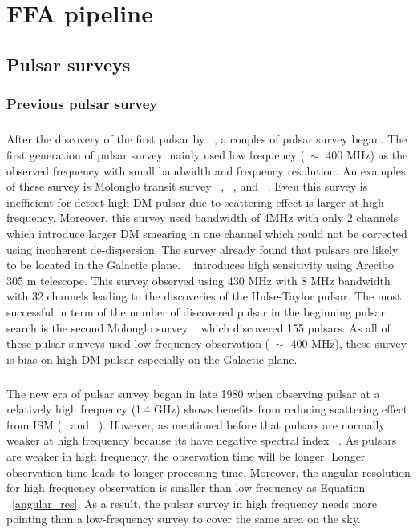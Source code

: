 \documentclass[thesis_msc.tex]{subfiles}
\begin{document}
\chapter{FFA pipeline} \label{FFA_c}
 	\section{Pulsar surveys}
        \subsection{Previous pulsar survey } \label{survey}
        \paragraph{} After the discovery of the first pulsar by ~\citep{HEWISH1968}, a couples of pulsar survey began. The first generation of pulsar survey mainly used low frequency ($~\sim$ 400 MHz) as the observed frequency with small bandwidth and frequency resolution. An examples of these survey is Molonglo transit survey ~\citep{Large:1968:mi}, ~\citep{Vaughan:1970:lm}, and ~\citep{Davies:1970:lm}. Even this survey is inefficient for detect high DM pulsar due to scattering effect is larger at high frequency. Moreover, this survey used bandwidth of 4MHz with only 2 channels which introduce larger DM smearing in one channel which could not be corrected using incoherent de-dispersion. The survey already found that pulsars are likely to be located in the Galactic plane. ~\cite{Hulse:1974:jh} introduces high sensitivity using Arecibo 305 m telescope. This survey  observed using 430 MHz with 8 MHz bandwidth with 32 channels leading to the discoveries of the Hulse-Taylor pulsar. The most successful in term of the number of discovered pulsar in the beginning pulsar search is the second Molonglo survey ~\citep{Manchester:1978:rl} which discovered 155 pulsars. As all of these pulsar surveys used low frequency observation ($~\sim$ 400 MHz), these survey is bias on high DM pulsar especially on the Galactic plane.  
        
        \paragraph{} The new era of pulsar survey began in late 1980 when observing pulsar at a relatively high frequency (1.4 GHz) shows benefits from reducing scattering effect from ISM (~\cite{johnston1992high} and ~\cite{clifton1992high}). However, as mentioned before that pulsars are normally weaker at high frequency because its have negative spectral index ~\citep{bates2013pulsar}. As pulsars are weaker in high frequency, the observation time will be longer. Longer observation time leads to longer processing time. Moreover, the angular resolution for high frequency observation is smaller than low frequency as Equation ~\ref{angular_res}. As a result, the pulsar survey in high frequency needs more pointing than a low-frequency survey to cover the same area on the sky. 
        
\end{document}
